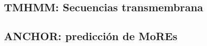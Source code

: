 % 
%   
%   
% 
% 
%   

  
  
  
  
  
  
\subsection{TMHMM: Secuencias transmembrana} \label{tmhmm}




 
 
\subsection{ANCHOR: predicción de MoREs } \label{anchor}

